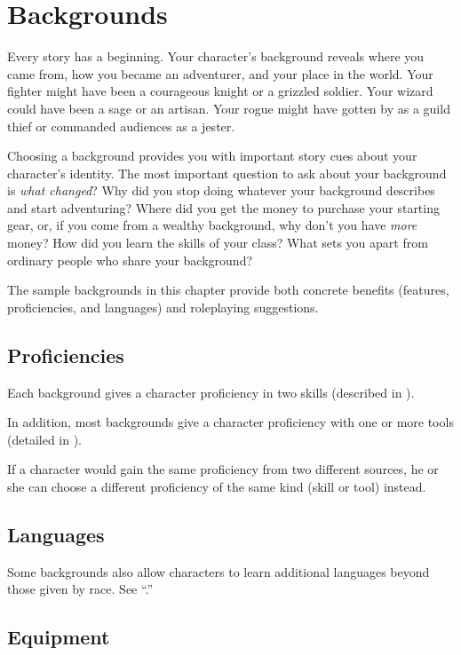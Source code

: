\documentclass[draft]{article}
\begin{document}
\section{Backgrounds}
\label{sec:backgrounds}

Every story has a beginning. Your character's background reveals where you came from, how you became an adventurer, and your place in the world. Your fighter might have been a courageous knight or a grizzled soldier. Your wizard could have been a sage or an artisan. Your rogue might have gotten by as a guild thief or commanded audiences as a jester.

Choosing a background provides you with important story cues about your character's identity. The most important question to ask about your background is \textit{what changed}? Why did you stop doing whatever your background describes and start adventuring? Where did you get the money to purchase your starting gear, or, if you come from a wealthy background, why don't you have \textit{more} money? How did you learn the skills of your class? What sets you apart from ordinary people who share your background?

The sample backgrounds in this chapter provide both concrete benefits (features, proficiencies, and languages) and roleplaying suggestions.

\subsection{Proficiencies}

Each background gives a character proficiency in two skills (described in ).

In addition, most backgrounds give a character proficiency with one or more tools (detailed in ).

If a character would gain the same proficiency from two different sources, he or she can choose a different proficiency of the same kind (skill or tool) instead.

\subsection{Languages}

Some backgrounds also allow characters to learn additional languages beyond those given by race. See “.”

\subsection{Equipment}
\end{document}
